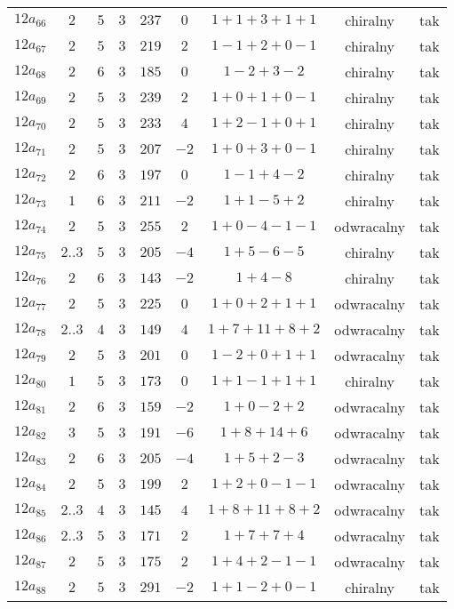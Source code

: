 \begin{longtable}{ccccccccc}
$12a_{66}$ & $2$ & $5$ & $3$ & $237$ & $0$ & $1+1+3+1+1$ & chiralny & tak \\
$12a_{67}$ & $2$ & $5$ & $3$ & $219$ & $2$ & $1-1+2+0-1$ & chiralny & tak \\
$12a_{68}$ & $2$ & $6$ & $3$ & $185$ & $0$ & $1-2+3-2$ & chiralny & tak \\
$12a_{69}$ & $2$ & $5$ & $3$ & $239$ & $2$ & $1+0+1+0-1$ & chiralny & tak \\
$12a_{70}$ & $2$ & $5$ & $3$ & $233$ & $4$ & $1+2-1+0+1$ & chiralny & tak \\
$12a_{71}$ & $2$ & $5$ & $3$ & $207$ & $-2$ & $1+0+3+0-1$ & chiralny & tak \\
$12a_{72}$ & $2$ & $6$ & $3$ & $197$ & $0$ & $1-1+4-2$ & chiralny & tak \\
$12a_{73}$ & $1$ & $6$ & $3$ & $211$ & $-2$ & $1+1-5+2$ & chiralny & tak \\
$12a_{74}$ & $2$ & $5$ & $3$ & $255$ & $2$ & $1+0-4-1-1$ & odwracalny & tak \\
$12a_{75}$ & $2..3$ & $5$ & $3$ & $205$ & $-4$ & $1+5-6-5$ & chiralny & tak \\
$12a_{76}$ & $2$ & $6$ & $3$ & $143$ & $-2$ & $1+4-8$ & chiralny & tak \\
$12a_{77}$ & $2$ & $5$ & $3$ & $225$ & $0$ & $1+0+2+1+1$ & odwracalny & tak \\
$12a_{78}$ & $2..3$ & $4$ & $3$ & $149$ & $4$ & $1+7+11+8+2$ & odwracalny & tak \\
$12a_{79}$ & $2$ & $5$ & $3$ & $201$ & $0$ & $1-2+0+1+1$ & odwracalny & tak \\
$12a_{80}$ & $1$ & $5$ & $3$ & $173$ & $0$ & $1+1-1+1+1$ & chiralny & tak \\
$12a_{81}$ & $2$ & $6$ & $3$ & $159$ & $-2$ & $1+0-2+2$ & odwracalny & tak \\
$12a_{82}$ & $3$ & $5$ & $3$ & $191$ & $-6$ & $1+8+14+6$ & odwracalny & tak \\
$12a_{83}$ & $2$ & $6$ & $3$ & $205$ & $-4$ & $1+5+2-3$ & odwracalny & tak \\
$12a_{84}$ & $2$ & $5$ & $3$ & $199$ & $2$ & $1+2+0-1-1$ & odwracalny & tak \\
$12a_{85}$ & $2..3$ & $4$ & $3$ & $145$ & $4$ & $1+8+11+8+2$ & odwracalny & tak \\
$12a_{86}$ & $2..3$ & $5$ & $3$ & $171$ & $2$ & $1+7+7+4$ & odwracalny & tak \\
$12a_{87}$ & $2$ & $5$ & $3$ & $175$ & $2$ & $1+4+2-1-1$ & odwracalny & tak \\
$12a_{88}$ & $2$ & $5$ & $3$ & $291$ & $-2$ & $1+1-2+0-1$ & chiralny & tak \\

\end{longtable}
